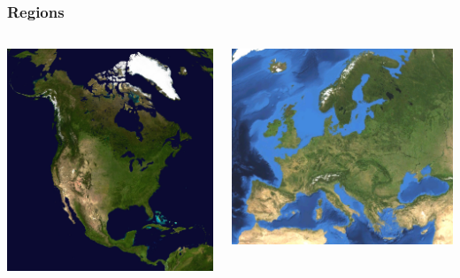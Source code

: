 \documentclass{beamer}
\begin{document}
\begin{frame}
  \frametitle{Regions}
  \begin{columns}
    \begin{column}{0.5\textwidth}
      \includegraphics[height=0.5\textheight,width=\textwidth,keepaspectratio=true]{figure/na_map}
    \end{column}
    \begin{column}{0.5\textwidth}
      \includegraphics[height=0.7\textheight,width=\textwidth,keepaspectratio=true]{figure/euro}
    \end{column}
  \end{columns}


\end{frame}
\end{document}
